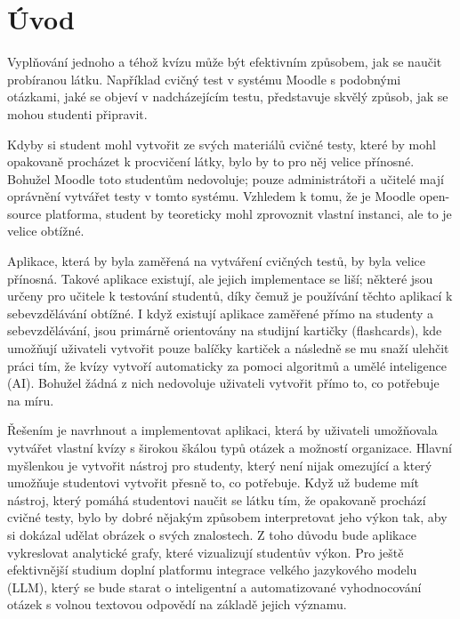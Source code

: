 \documentclass{vskpou} %
\begin{document}
\section*{Úvod}

Vyplňování jednoho a téhož kvízu může být efektivním způsobem, jak se naučit probíranou látku. Například cvičný test v systému Moodle s podobnými otázkami, jaké se objeví v nadcházejícím testu, představuje skvělý způsob, jak se mohou studenti připravit.

Kdyby si student mohl vytvořit ze svých materiálů cvičné testy, které by mohl opakovaně procházet k procvičení látky, bylo by to pro něj velice přínosné. Bohužel Moodle toto studentům nedovoluje; pouze administrátoři a učitelé mají oprávnění vytvářet testy v tomto systému. Vzhledem k tomu, že je Moodle open-source platforma, student by teoreticky mohl zprovoznit vlastní instanci, ale to je velice obtížné.

Aplikace, která by byla zaměřená na vytváření cvičných testů, by byla velice přínosná. Takové aplikace existují, ale jejich implementace se liší; některé jsou určeny pro učitele k testování studentů, díky čemuž je používání těchto aplikací k sebevzdělávání obtížné. I když existují aplikace zaměřené přímo na studenty a sebevzdělávání, jsou primárně orientovány na studijní kartičky (flashcards), kde umožňují uživateli vytvořit pouze balíčky kartiček a následně se mu snaží ulehčit práci tím, že kvízy vytvoří automaticky za pomoci algoritmů a umělé inteligence (AI). Bohužel žádná z nich nedovoluje uživateli vytvořit přímo to, co potřebuje na míru.

Řešením je navrhnout a implementovat aplikaci, která by uživateli umožňovala vytvářet vlastní kvízy s širokou škálou typů otázek a možností organizace. Hlavní myšlenkou je vytvořit nástroj pro studenty, který není nijak omezující a který umožňuje studentovi vytvořit přesně to, co potřebuje. Když už budeme mít nástroj, který pomáhá studentovi naučit se látku tím, že opakovaně prochází cvičné testy, bylo by dobré nějakým způsobem interpretovat jeho výkon tak, aby si dokázal udělat obrázek o svých znalostech. Z toho důvodu bude aplikace vykreslovat analytické grafy, které vizualizují studentův výkon. Pro ještě efektivnější studium doplní platformu integrace velkého jazykového modelu (LLM), který se bude starat o inteligentní a automatizované vyhodnocování otázek s volnou textovou odpovědí na základě jejich významu.
\end{document}
